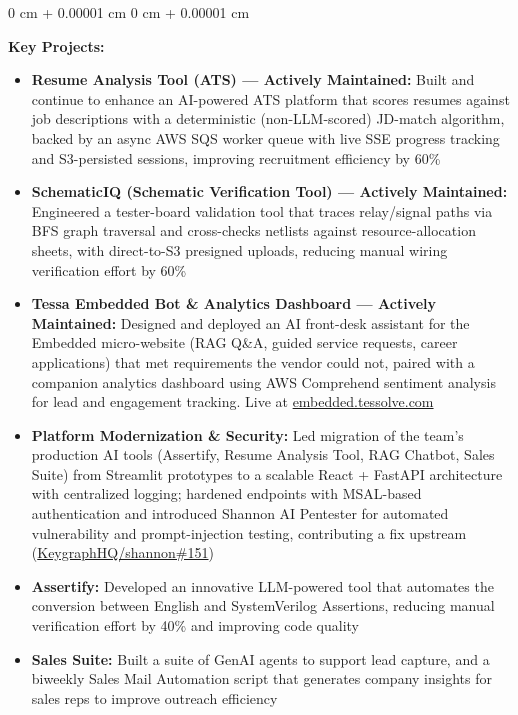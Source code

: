 \documentclass[10pt, letterpaper]{article}
\newenvironment{highlights}{
    \begin{itemize}[
        topsep=0.10 cm,
        parsep=0.10 cm,
        partopsep=0pt,
        itemsep=0pt,
        leftmargin=0 cm + 10pt
    ]
}{
    \end{itemize}
} %
\newenvironment{onecolentry}{
    \begin{adjustwidth}{
        0 cm + 0.00001 cm
    }{
        0 cm + 0.00001 cm
    }
}{
    \end{adjustwidth}
} %
\let\hrefWithoutArrow\href
\begin{document}
        \vspace{0.25 cm}
        \begin{onecolentry}
        \textbf{Key Projects:}
            \begin{highlights}
                \item \textbf{Resume Analysis Tool (ATS) — Actively Maintained:} Built and continue to enhance an AI-powered ATS platform that scores resumes against job descriptions with a deterministic (non-LLM-scored) JD-match algorithm, backed by an async AWS SQS worker queue with live SSE progress tracking and S3-persisted sessions, improving recruitment efficiency by 60\%
                \item \textbf{SchematicIQ (Schematic Verification Tool) — Actively Maintained:} Engineered a tester-board validation tool that traces relay/signal paths via BFS graph traversal and cross-checks netlists against resource-allocation sheets, with direct-to-S3 presigned uploads, reducing manual wiring verification effort by 60\%
                \item \textbf{Tessa Embedded Bot \& Analytics Dashboard — Actively Maintained:} Designed and deployed an AI front-desk assistant for the Embedded micro-website (RAG Q\&A, guided service requests, career applications) that met requirements the vendor could not, paired with a companion analytics dashboard using AWS Comprehend sentiment analysis for lead and engagement tracking. Live at \mbox{\hrefWithoutArrow{https://embedded.tessolve.com/}{embedded.tessolve.com}}%
                \item \textbf{Platform Modernization \& Security:} Led migration of the team's production AI tools (Assertify, Resume Analysis Tool, RAG Chatbot, Sales Suite) from Streamlit prototypes to a scalable React + FastAPI architecture with centralized logging; hardened endpoints with MSAL-based authentication and introduced Shannon AI Pentester for automated vulnerability and prompt-injection testing, contributing a fix upstream (\mbox{\hrefWithoutArrow{https://github.com/KeygraphHQ/shannon/issues/151}{KeygraphHQ/shannon\#151}})%
                \item \textbf{Assertify:} Developed an innovative LLM-powered tool that automates the conversion between English and SystemVerilog Assertions, reducing manual verification effort by 40\% and improving code quality
                \item \textbf{Sales Suite:} Built a suite of GenAI agents to support lead capture, and a biweekly Sales Mail Automation script that generates company insights for sales reps to improve outreach efficiency

\end{highlights}
\end{onecolentry}
\end{document}
